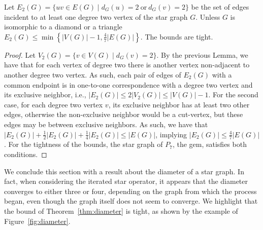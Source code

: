 \begin{corollary}
    Let $E_2(G) = \{uv \in E(G) \mid d_G(u) = 2\ \text{or}\ d_G(v) = 2\}$ be the set of edges incident to at least one degree two vertex of the star graph $G$. Unless $G$ is isomorphic to a diamond or a triangle $E_2(G) \leq \min\left\{|V(G)| - 1, \frac{4}{7}|E(G)|\right\}$.
    The bounds are tight.
\end{corollary}

\begin{proof}
    Let $V_2(G) = \{v \in V(G) \mid d_G(v) = 2\}$.
    By the previous Lemma, we have that for each vertex of degree two there is another vertex non-adjacent to another degree two vertex.
    As such, each pair of edges of $E_2(G)$ with a common endpoint is in one-to-one correspondence with a degree two vertex and its exclusive neighbor, i.e., $|E_2(G)| \leq 2|V_2(G)| \leq |V(G)| - 1$.
    For the second case, for each degree two vertex $v$, its exclusive neighbor has at least two other edges, otherwise the non-exclusive neighbor would be a cut-vertex, but these edges may be between exclusive neighbors.
    As such, we have that $|E_2(G)| + \frac{1}{2}|E_2(G)| + \frac{1}{4}|E_2(G)| \leq |E(G)|$, implying $|E_2(G)| \leq \frac{4}{7}|E(G)|$.
    For the tightness of the bounds, the star graph of $P_7$, the gem, satisfies both conditions.
\end{proof}

We conclude this section with a result about the diameter of a star graph.
In fact, when considering the iterated star operator, it appears that the diameter converges to either three or four, depending on the graph from which the process began, even though the graph itself does not seem to converge.
We highlight that the bound of Theorem~\ref{thm:diameter} is tight, as shown by the example of Figure~\ref{fig:diameter}.


